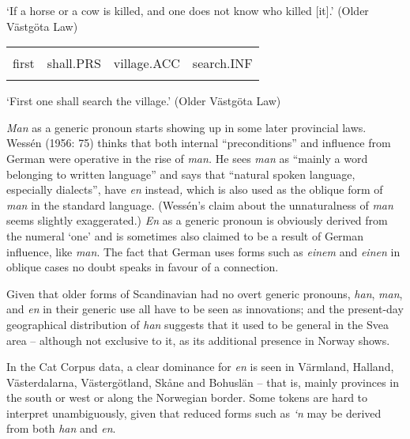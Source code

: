 \begin{styleTranslation}
‘If a horse or a cow is killed, and one does not know who killed [it].’ (Older Västgöta Law)

\end{styleTranslation}

\begin{tabular}{llll}
\lsptoprule
\multicolumn{4}{l}{Fyrst

}\\
first & shall.PRS & village.ACC & search.INF\\
\lspbottomrule
\end{tabular}

\begin{styleTranslation}
‘First one shall search the village.’ (Older Västgöta Law)

\end{styleTranslation}

\begin{styleBodyTextFirst}
\textit{Man} as a generic pronoun starts showing up in some later provincial laws. Wessén (1956: 75) thinks that both internal “preconditions” and influence from German were operative in the rise of \textit{man. }He sees \textit{man} as “mainly a word belonging to written language” and says that “natural spoken language, especially dialects”, have \textit{en }instead\textit{, }which is also used as the oblique form of \textit{man} in the standard language. (Wessén’s claim about the unnaturalness of \textit{man} seems slightly exaggerated.) \textit{En }as a generic pronoun is obviously derived from the numeral ‘one’ and is sometimes also claimed to be a result of German influence, like \textit{man}. The fact that German uses forms such as \textit{einem} and \textit{einen} in oblique cases no doubt speaks in favour of a connection.

\end{styleBodyTextFirst}

\begin{styleBodytextC}
Given that older forms of Scandinavian had no overt generic pronouns, \textit{han}, \textit{man}, and \textit{en} in their generic use all have to be seen as innovations; and the present-day geographical distribution of \textit{han} suggests that it used to be general in the Svea area – although not exclusive to it, as its additional presence in Norway shows. 

\end{styleBodytextC}

\begin{styleBodytextC}
In the Cat Corpus data, a clear dominance for \textit{en }is seen in Värmland, Halland, Västerdalarna, Västergötland, Skåne and Bohuslän – that is, mainly provinces in the south or west or along the Norwegian border. Some tokens are hard to interpret unambiguously, given that reduced forms such as \textit{‘n} may be derived from both \textit{han} and \textit{en}. 

\end{styleBodytextC}


